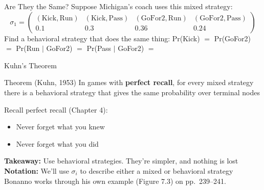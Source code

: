 \begin{frame}{Are They the Same?}
Suppose Michigan's coach uses this mixed strategy:
$$\sigma_1=\begin{pmatrix} (\text{Kick},\text{Run}) & (\text{Kick},\text{Pass}) & (\text{GoFor2},\text{Run}) & (\text{GoFor2},\text{Pass}) \\ 0.1 & 0.3 & 0.36 & 0.24\end{pmatrix}$$
\bsk
Find a behavioral strategy that does the same thing:
\bsk
Pr(Kick) $=$ \underline{\hspace{1in}}\quad Pr(GoFor2) $=$ \underline{\hspace{1in}}
\bsk
Pr(Run $\mid$ GoFor2) $=$ \underline{\hspace{1in}}\quad Pr(Pass $\mid$ GoFor2) $=$ \underline{\hspace{1in}}
\bsk
{}
\vfill
{}
\vspace{-0.3in}
\end{frame}

\begin{frame}{Kuhn's Theorem}
\begin{block}{Theorem (Kuhn, 1953)}
In games with \textbf{perfect recall}, for every mixed strategy there is a behavioral strategy that gives the same probability over terminal nodes
\end{block}
\bsk
Recall perfect recall (Chapter 4):
\begin{itemize}
    \item Never forget what you knew
    \item Never forget what you did
\end{itemize}
\bsk
\textbf{Takeaway:} Use behavioral strategies. They're simpler, and nothing is lost
\bsk
\textbf{Notation:} We'll use $\sigma_i$ to describe either a mixed or behavioral strategy
\vfill
{\footnotesize Bonanno works through his own example (Figure 7.3) on pp.~239--241.}
\vspace{-0.2in}
\end{frame}

